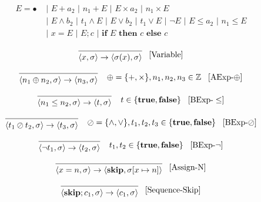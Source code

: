 \begin{align*}
E = \bullet &\text{ | } E + a_2 \text{ | } n_1 + E \text{ | } E \times a_2 \text{ | } n_1 \times E \\
  &\text{ | } E \land b_2 \text{ | } t_1 \land E  \text{ | } E \lor b_2 \text{ | } t_1 \lor E \text{ | } \neg E \text{ | } E \leq a_2 \text{ | } n_1 \leq E  \\
  &\text{ | } x = E \text{ | } E;c \text{ | } \textbf{if } E \textbf{ then } c \textbf{ else } c
\end{align*}

\[
\begin{prooftree}
\infer0{
	\langle x, \sigma \rangle 
	\rightarrow  
	\langle \sigma(x), \sigma \rangle 
}
\end{prooftree} \; \; \; [\text{Variable}]
\]

\[
\begin{prooftree}
\infer0{
	\langle n_1 \oplus n_2, \sigma \rangle \rightarrow  
	\langle n_3,  \sigma \rangle
}
\end{prooftree} \; \; \; \; \oplus = \{+,\times\}, n_1, n_2, n_3 \in \mathbb{Z} \; \; \; [\text{AExp-}\oplus]
\]

\[
\begin{prooftree}
\infer0{
	\langle n_1 \leq n_2, \sigma \rangle \rightarrow  
	\langle t, \sigma \rangle
}
\end{prooftree} \; \; \; \; t \in \{ \textbf{true}, \textbf{false} \} \; \; \; [\text{BExp-}\leq]
\]

\[
\begin{prooftree}
\infer0{
	\langle t_1 \oslash t_2, \sigma \rangle \rightarrow  
	\langle t_3,  \sigma \rangle
}
\end{prooftree} \; \; \; \; \oslash = \{\land,\lor\}, t_1, t_2, t_3 \in \{ \textbf{true}, \textbf{false} \}  \; \; \; [\text{BExp-}\oslash]
\]

\[
\begin{prooftree}
\infer0{
	\langle \neg t_1, \sigma \rangle \rightarrow  
	\langle t_2,  \sigma \rangle
}
\end{prooftree} \; \; \; \; t_1, t_2 \in \{ \textbf{true}, \textbf{false} \}  \; \; \; [\text{BExp-}\neg]
\]

\[
\begin{prooftree}
\infer0{
	\langle x = n, \sigma \rangle \rightarrow  
	\langle \textbf{skip},  \sigma[x \mapsto n] \rangle
}
\end{prooftree} \; \; \; [\text{Assign-N}]
\]

\[
\begin{prooftree}
\infer0{
	\langle \textbf{skip}; c_1,  \sigma \rangle \rightarrow  
	\langle c_1, \sigma \rangle
}
\end{prooftree} \; \; \; [\text{Sequence-Skip}]
\]


